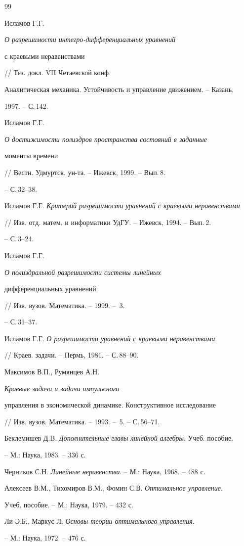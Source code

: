 \begin{thebibliography}{99}







Исламов Г.Г. {\em О разрешимости интегро-дифференциальных уравнений


с краевыми неравенствами} // Тез. докл. VII Четаевской конф.


Аналитическая механика. Устойчивость и управление движением. -- Казань,


1997. -- С.\,142.




Исламов Г.Г. {\em О достижимости полиэдров пространства состояний в заданные


моменты времени} // Вестн. Удмуртск. ун-та. -- Ижевск, 1999. -- Вып.\,8.


-- С.\,32--38.




Исламов Г.Г. {\em Критерий разрешимости уравнений с краевыми неравенствами}


// Изв. отд. матем. и информатики УдГУ. -- Ижевск, 1994. -- Вып.\,2.


-- С.\,3--24.




Исламов Г.Г. {\em О полиэдральной разрешимости системы линейных


дифференциальных уравнений} // Изв. вузов. Математика. -- 1999. -- \No\,3.


-- С.\,31--37.




Исламов Г.Г. {\em О разрешимости уравнений с краевыми неравенствами}


// Краев. задачи. -- Пермь, 1981. -- С.\,88--90.




Максимов В.П., Румянцев А.Н. {\em Краевые задачи и задачи импульсного


управления в экономической динамике. Конструктивное исследование}


// Изв. вузов. Математика. -- 1993. -- \No\,5. -- С.\,56--71.




Беклемишев Д.B. {\em Дополнительные главы линейной алгебры}. Учеб. пособие.


-- М.: Наука, 1983. -- 336 с.




Черников С.Н. {\em Линейные неравенства}. -- М.: Наука, 1968. -- 488 с.




Алексеев В.М., Тихомиров В.М., Фомин С.В. {\em Оптимальное управление}.


Учеб. пособие. -- М.: Наука, 1979. -- 432 с.




Ли Э.Б., Маркус Л. {\em Основы теории оптимального управления}.


-- М.: Наука, 1972. -- 476 с.





\end{thebibliography}
